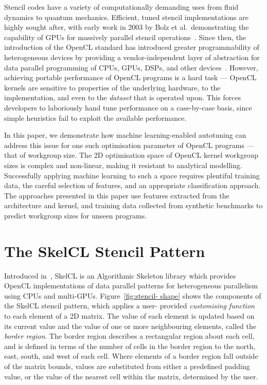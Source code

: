 \documentclass[preprint,nonatbib,10pt,nocopyrightspace]{sigplanconf}
\begin{document}
  Stencil codes have a variety of computationally demanding uses from fluid
  dynamics to quantum mechanics. Efficient, tuned stencil implementations are
  highly sought after, with early work in 2003 by Bolz et al.\ demonstrating the
  capability of GPUs for massively parallel stencil operations~\cite{Bolz2003}.
  Since then, the introduction of the OpenCL standard has introduced greater
  programmability of heterogeneous devices by providing a vendor-independent layer
  of abstraction for data parallel programming of CPUs, GPUs, DSPs, and other
  devices~\cite{Stone2010}. However, achieving portable performance of OpenCL
  programs is a hard task --- OpenCL kernels are sensitive to properties of the
  underlying hardware, to the implementation, and even to the \emph{dataset} that
  is operated upon. This forces developers to laboriously hand tune performance on
  a case-by-case basis, since simple heuristics fail to exploit the available
  performance.

  In this paper, we demonstrate how machine learning-enabled autotuning can
  address this issue for one such optimisation parameter of OpenCL programs ---
  that of workgroup size. The 2D optimisation space of OpenCL kernel workgroup
  sizes is complex and non-linear, making it resistant to analytical modelling.
  Successfully applying machine learning to such a space requires plentiful
  training data, the careful selection of features, and an appropriate
  classification approach. The approaches presented in this paper use features
  extracted from the architecture and kernel, and training data collected from
  synthetic benchmarks to predict workgroup sizes for unseen programs.


  \section{The SkelCL Stencil Pattern}

  Introduced in~\cite{Steuwer2011}, SkelCL is an Algorithmic Skeleton library
  which provides OpenCL implementations of data parallel patterns for
  heterogeneous parallelism using CPUs and multi-GPUs. Figure~\ref{fig:stencil-
  shape} shows the components of the SkelCL stencil pattern, which applies a user-
  provided \emph{customising function} to each element of a 2D matrix. The value
  of each element is updated based on its current value and the value of one or
  more neighbouring elements, called the \emph{border region}. The border region
  describes a rectangular region about each cell, and is defined in terms of the
  number of cells in the border region to the north, east, south, and west of each
  cell. Where elements of a border region fall outside of the matrix bounds,
  values are substituted from either a predefined padding value, or the value of
  the nearest cell within the matrix, determined by the user.
\end{document}
